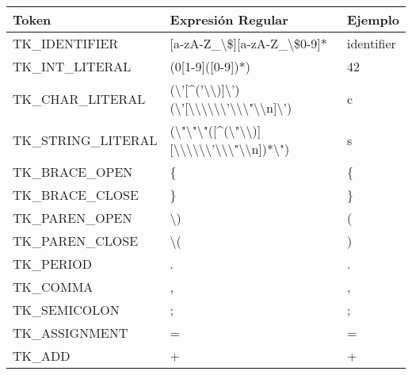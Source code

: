 \documentclass [a4paper,titlepage]{report}
\begin{document}
\begin{longtable}{l | l | l}
\bfseries{Token}     & \bfseries{Expresión Regular}                                          & \bfseries{Ejemplo}                \tabularnewline \endhead
TK\_IDENTIFIER       & [a-zA-Z\_{}\textbackslash{}\${}][a-zA-Z\_{}\textbackslash{}\${}0-9]*  & identifier                        \tabularnewline
TK\_INT\_LITERAL     & (0\textbar{}[1-9]([0-9])*)                                            & 42                                \tabularnewline
TK\_CHAR\_LITERAL    & (\textbackslash{}'[\^{}('\textbackslash{}\textbackslash{})]\textbackslash{}')\textbar{}(\textbackslash{}'[\textbackslash{}\textbackslash{}\textbackslash{}\textbackslash{}\textbar{}\textbackslash{}\textbackslash{}'\textbar{}\textbackslash{}\textbackslash{}\textbackslash{}"\textbar{}\textbackslash{}\textbackslash{}n]\textbackslash{}')  & \textquotesingle{}c\textquotesingle{}   \tabularnewline
TK\_STRING\_LITERAL  & (\textbackslash{}"\textbackslash{}"\textbar{}\textbackslash{}"([\^{}(\textbackslash{}"\textbackslash{}\textbackslash{})]\textbar{}[\textbackslash{}\textbackslash{}\textbackslash{}\textbackslash{}\textbar{}\textbackslash{}\textbackslash{}'\textbar{}\textbackslash{}\textbackslash{}\textbackslash{}"\textbar{}\textbackslash{}\textbackslash{}n])*\textbackslash{}") & \textquotedbl{}s\textquotedbl{}   \tabularnewline
TK\_BRACE\_OPEN      & \{{}                                                                  & \{{}                              \tabularnewline
TK\_BRACE\_CLOSE     & \}{}                                                                  & \}{}                              \tabularnewline
TK\_PAREN\_OPEN      & \textbackslash{})                                                     & (                                 \tabularnewline
TK\_PAREN\_CLOSE     & \textbackslash{}(                                                     & )                                 \tabularnewline
TK\_PERIOD           & .                                                                     & .                                 \tabularnewline
TK\_COMMA            & ,                                                                     & ,                                 \tabularnewline
TK\_SEMICOLON        & ;                                                                     & ;                                 \tabularnewline
TK\_ASSIGNMENT       & =                                                                     & =                                 \tabularnewline
TK\_ADD              & +                                                                     & +                                 \tabularnewline

\end{longtable}
\end{document}
